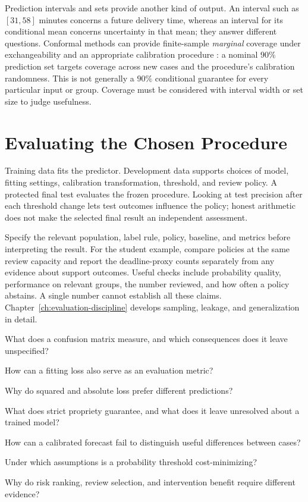 Prediction intervals and sets provide another kind of output. An interval such as $[31,58]$ minutes concerns a future delivery time, whereas an interval for its conditional mean concerns uncertainty in that mean; they answer different questions. Conformal methods can provide finite-sample \emph{marginal} coverage under exchangeability and an appropriate calibration procedure \citep{shafer2008}: a nominal $90\%$ prediction set targets coverage across new cases and the procedure's calibration randomness. This is not generally a $90\%$ conditional guarantee for every particular input or group. Coverage must be considered with interval width or set size to judge usefulness.

\section{Evaluating the Chosen Procedure}

Training data fits the predictor. Development data supports choices of model, fitting settings, calibration transformation, threshold, and review policy. A protected final test evaluates the frozen procedure. Looking at test precision after each threshold change lets test outcomes influence the policy; honest arithmetic does not make the selected final result an independent assessment.

\par\noindent\begin{minipage}{\linewidth}
Specify the relevant population, label rule, policy, baseline, and metrics before interpreting the result. For the student example, compare policies at the same review capacity and report the deadline-proxy counts separately from any evidence about support outcomes. Useful checks include probability quality, performance on relevant groups, the number reviewed, and how often a policy abstains. A single number cannot establish all these claims. Chapter~\ref{ch:evaluation-discipline} develops sampling, leakage, and generalization in detail.
\end{minipage}\par

\begin{samepage}
\begin{studyquestions}
\item What does a confusion matrix measure, and which consequences does it leave unspecified?
\item How can a fitting loss also serve as an evaluation metric?
\item Why do squared and absolute loss prefer different predictions?
\item What does strict propriety guarantee, and what does it leave unresolved about a trained model?
\item How can a calibrated forecast fail to distinguish useful differences between cases?
\item Under which assumptions is a probability threshold cost-minimizing?
\item Why do risk ranking, review selection, and intervention benefit require different evidence?
\end{studyquestions}
\end{samepage}

